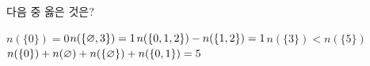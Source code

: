 다음 중 옳은 것은?
\begin{choicesii}{$n(\{0\})=0$}{$n(\{\varnothing{,}\mkern3mu\mathopen{}3\})=1$}{$n(\{0{,}\mkern3mu\mathopen{}1{,}\mkern3mu\mathopen{}2\})-n(\{1{,}\mkern3mu\mathopen{}2\})=1$}{$n(\{3\})<n(\{5\})$}{$n(\{0\})+n(\varnothing)+n(\{\varnothing\})+n(\{0{,}\mkern3mu\mathopen{}1\})=5$}\end{choicesii}
